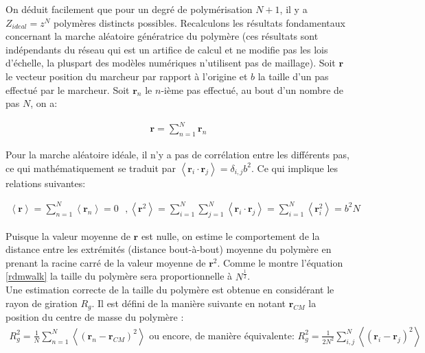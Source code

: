 \documentclass[a4paper,11pt]{article}
\begin{document}
On déduit facilement que pour un degré de polymérisation $N+1$, il y a $Z_{ideal}=z^N$ polymères distincts possibles. Recalculons les résultats fondamentaux concernant la marche aléatoire génératrice du polymère (ces résultats sont indépendants du réseau qui est un artifice de calcul et ne modifie pas les lois d'échelle, la pluspart des modèles numériques n'utilisent pas de maillage). Soit $\textbf{r}$ le vecteur position du marcheur par rapport à l'origine et $b$ la taille d'un pas effectué par le marcheur. Soit $\textbf{r}_n$ le $n$-ième pas effectué, au bout d'un nombre de pas $N$, on a: 

\begin{eqnarray}
\textbf{r} = \sum_{n = 1}^{N} \textbf{r}_n
\end{eqnarray}

Pour la marche aléatoire idéale, il n'y a pas de corrélation entre les différents pas, ce qui mathématiquement se traduit par $\left<\textbf{r}_i \cdot \textbf{r}_j\right> = \delta_{i,j} b^2$. Ce qui implique les relations suivantes:

\begin{eqnarray}
\left<\textbf{r}\right>\text{} = \sum_{n = 1}^{N} \left<\textbf{r}_n \right>\text{} =\text{} 0 \text{ }, \text{} \left<\textbf{r}^2\right> \text{}= \sum_{i = 1}^{N} \sum_{j = 1}^{N} \left<\textbf{r}_i \cdot \textbf{r}_j\right> \text{}= \sum_{i = 1}^{N} \left<\textbf{r}_i^2\right> \text{}= b^2 N
\label{rdmwalk}
\end{eqnarray}

 Puisque la valeur moyenne de $\textbf{r}$ est nulle, on estime le comportement de la distance entre les extrémités (distance bout-à-bout) moyenne du polymère en prenant la racine carré de la valeur moyenne de $\textbf{r}^2$. Comme le montre l'équation \ref{rdmwalk} la taille du polymère sera proportionnelle à $N^\frac{1}{2}$.\\
 
 Une estimation correcte de la taille du polymère est obtenue en considérant le rayon de giration $R_g$. Il est défini de la manière suivante en notant $\textbf{r}_{CM}$ la position du centre de masse du polymère :
 \begin{eqnarray}
R_g^2\text{}=\text{}\frac{1}{N}\sum_{n = 1}^{N} \left<(\textbf{r}_n-\textbf{r}_{CM})^2\right>
 \text{ ou encore, de manière équivalente: }
R_g^2\text{}=\text{}\frac{1}{2N^2}\sum_{i,j}^N \left<(\textbf{r}_i-\textbf{r}_{j})^2\right>
\label{equ}
\end{eqnarray}
 
\end{document}
